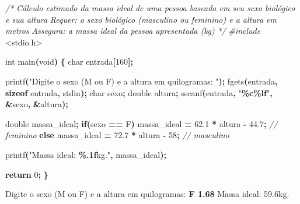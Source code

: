 \documentclass[
  11pt,
  a4paper,
]{scrbook}
\newenvironment{Shaded}{\begin{snugshade}}{\end{snugshade}}
\newcommand{\CharTok}[1]{\textcolor[rgb]{0.31,0.60,0.02}{#1}}
\newcommand{\CommentTok}[1]{\textcolor[rgb]{0.56,0.35,0.01}{\textit{#1}}}
\newcommand{\ControlFlowTok}[1]{\textcolor[rgb]{0.13,0.29,0.53}{\textbf{#1}}}
\newcommand{\DataTypeTok}[1]{\textcolor[rgb]{0.13,0.29,0.53}{#1}}
\newcommand{\DecValTok}[1]{\textcolor[rgb]{0.00,0.00,0.81}{#1}}
\newcommand{\FloatTok}[1]{\textcolor[rgb]{0.00,0.00,0.81}{#1}}
\newcommand{\ImportTok}[1]{#1}
\newcommand{\KeywordTok}[1]{\textcolor[rgb]{0.13,0.29,0.53}{\textbf{#1}}}
\newcommand{\NormalTok}[1]{#1}
\newcommand{\OperatorTok}[1]{\textcolor[rgb]{0.81,0.36,0.00}{\textbf{#1}}}
\newcommand{\PreprocessorTok}[1]{\textcolor[rgb]{0.56,0.35,0.01}{\textit{#1}}}
\newcommand{\SpecialCharTok}[1]{\textcolor[rgb]{0.81,0.36,0.00}{\textbf{#1}}}
\newcommand{\StringTok}[1]{\textcolor[rgb]{0.31,0.60,0.02}{#1}}
\begin{document}
\begin{Shaded}
\begin{Highlighting}[]
\CommentTok{/*}
\CommentTok{Cálculo estimado da massa ideal de uma pessoa baseada em seu sexo biológico}
\CommentTok{    e sua altura}
\CommentTok{Requer: o sexo biológico (masculino ou feminino) e a altura em metros}
\CommentTok{Assegura: a massa ideal da pessoa apresentada (kg)}
\CommentTok{*/}
\PreprocessorTok{\#include }\ImportTok{\textless{}stdio.h\textgreater{}}

\DataTypeTok{int}\NormalTok{ main}\OperatorTok{(}\DataTypeTok{void}\OperatorTok{)} \OperatorTok{\{}
    \DataTypeTok{char}\NormalTok{ entrada}\OperatorTok{[}\DecValTok{160}\OperatorTok{];}

\NormalTok{    printf}\OperatorTok{(}\StringTok{"Digite o sexo (M ou F) e a altura em quilogramas: "}\OperatorTok{);}
\NormalTok{    fgets}\OperatorTok{(}\NormalTok{entrada}\OperatorTok{,} \KeywordTok{sizeof}\NormalTok{ entrada}\OperatorTok{,}\NormalTok{ stdin}\OperatorTok{);}
    \DataTypeTok{char}\NormalTok{ sexo}\OperatorTok{;}
    \DataTypeTok{double}\NormalTok{ altura}\OperatorTok{;}
\NormalTok{    sscanf}\OperatorTok{(}\NormalTok{entrada}\OperatorTok{,} \StringTok{"}\SpecialCharTok{\%c\%lf}\StringTok{"}\OperatorTok{,} \OperatorTok{\&}\NormalTok{sexo}\OperatorTok{,} \OperatorTok{\&}\NormalTok{altura}\OperatorTok{);}

    \DataTypeTok{double}\NormalTok{ massa\_ideal}\OperatorTok{;}
    \ControlFlowTok{if}\OperatorTok{(}\NormalTok{sexo }\OperatorTok{==} \CharTok{\textquotesingle{}F\textquotesingle{}}\OperatorTok{)}
\NormalTok{        massa\_ideal }\OperatorTok{=} \FloatTok{62.1} \OperatorTok{*}\NormalTok{ altura }\OperatorTok{{-}} \FloatTok{44.7}\OperatorTok{;}  \CommentTok{// feminino}
    \ControlFlowTok{else}
\NormalTok{        massa\_ideal }\OperatorTok{=} \FloatTok{72.7} \OperatorTok{*}\NormalTok{ altura }\OperatorTok{{-}} \DecValTok{58}\OperatorTok{;}  \CommentTok{// masculino}

\NormalTok{    printf}\OperatorTok{(}\StringTok{"Massa ideal: }\SpecialCharTok{\%.1f}\StringTok{kg."}\OperatorTok{,}\NormalTok{ massa\_ideal}\OperatorTok{);}

    \ControlFlowTok{return} \DecValTok{0}\OperatorTok{;}
\OperatorTok{\}}
\end{Highlighting}
\end{Shaded}

\begin{Shaded}
\begin{Highlighting}[]
\NormalTok{Digite o sexo (M ou F) e a altura em quilogramas: }\KeywordTok{ F 1.68 }
\NormalTok{Massa ideal: 59.6kg.}
\end{Highlighting}
\end{Shaded}
\end{document}
